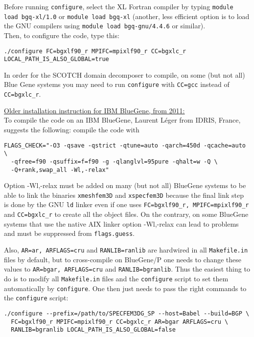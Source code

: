 \noindent Before running \texttt{configure}, select the XL Fortran
compiler by typing \texttt{module load bgq-xl/1.0} or \texttt{module
load bgq-xl} (another, less efficient option is to load the GNU compilers
using \texttt{module load bgq-gnu/4.4.6} or similar).\\


\noindent Then, to configure the code, type this:
\begin{verbatim}
./configure FC=bgxlf90_r MPIFC=mpixlf90_r CC=bgxlc_r LOCAL_PATH_IS_ALSO_GLOBAL=true
\end{verbatim}

In order for the SCOTCH domain decomposer to compile, on some (but
not all) Blue Gene systems you may need to run \texttt{configure}
with \texttt{CC=gcc} instead of \texttt{CC=bgxlc\_r}.

\noindent \underline{Older installation instruction for IBM BlueGene, from 2011:}\\


\noindent To compile the code on an IBM BlueGene, Laurent L\'eger from
IDRIS, France, suggests the following: compile the code with
\begin{verbatim}
FLAGS_CHECK="-O3 -qsave -qstrict -qtune=auto -qarch=450d -qcache=auto \
  -qfree=f90 -qsuffix=f=f90 -g -qlanglvl=95pure -qhalt=w -Q \
  -Q+rank,swap_all -Wl,-relax"
\end{verbatim}

\noindent
Option \textquotedbl{}-Wl,-relax\textquotedbl{} must be
added on many (but not all) BlueGene systems to be able to link the
binaries \texttt{xmeshfem3D} and \texttt{xspecfem3D} because the final
link step is done by the GNU \texttt{ld} linker even if one uses \texttt{FC=bgxlf90\_r,
MPIFC=mpixlf90\_r} and \texttt{CC=bgxlc\_r} to create all the object
files. On the contrary, on some BlueGene systems that use the native
AIX linker option \textquotedbl{}-Wl,-relax\textquotedbl{} can lead
to problems and must be suppressed from \texttt{flags.guess}.

\noindent Also, \texttt{AR=ar, ARFLAGS=cru} and \texttt{RANLIB=ranlib}
are hardwired in all \texttt{Makefile.in} files by default, but to
cross-compile on BlueGene/P one needs to change these values to \texttt{AR=bgar,
ARFLAGS=cru} and \texttt{RANLIB=bgranlib}. Thus the easiest thing
to do is to modify all \texttt{Makefile.in} files and the \texttt{configure}
script to set them automatically by \texttt{configure}. One then just
needs to pass the right commands to the \texttt{configure} script:
\begin{verbatim}
./configure --prefix=/path/to/SPECFEM3DG_SP --host=Babel --build=BGP \
  FC=bgxlf90_r MPIFC=mpixlf90_r CC=bgxlc_r AR=bgar ARFLAGS=cru \
  RANLIB=bgranlib LOCAL_PATH_IS_ALSO_GLOBAL=false
\end{verbatim}


